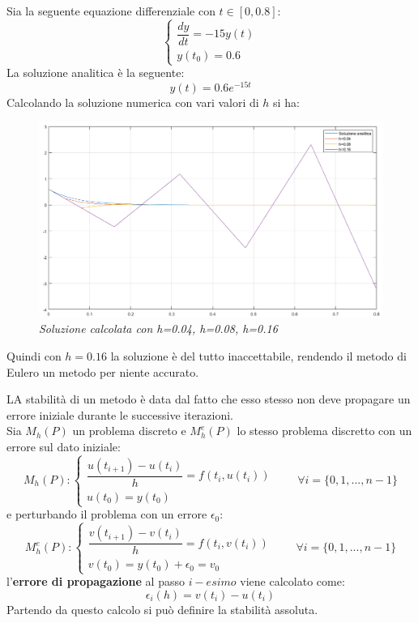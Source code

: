 \begin{example}
	Sia la seguente equazione differenziale	con $t \in [0,0.8]$:
	\begin{equation*}
		\begin{cases}
			\dfrac{dy}{dt} = -15y(t) \\[0.2cm]
			y(t_{0}) = 0.6
		\end{cases}
	\end{equation*}
	La soluzione analitica è la seguente:
	\begin{equation*}
		y(t) = 0.6 e^{-15t}
	\end{equation*}
	Calcolando la soluzione numerica con vari valori di $h$ si ha:
	\begin{figure}[H]
		\centering
		\includegraphics[width=\textwidth]{matlab/stabilita.png}
		\caption{\textit{Soluzione calcolata con h=0.04, h=0.08, h=0.16}}
	\end{figure}
	Quindi con $h=0.16$ la soluzione è del tutto inaccettabile, rendendo il metodo di Eulero un metodo per niente accurato.
\end{example}
LA stabilità di un metodo è data dal fatto che esso stesso non deve propagare un errore iniziale durante le successive iterazioni.
\\Sia $M_h(P)$ un problema discreto e $M^e_h(P)$ lo stesso problema discretto con un errore sul dato iniziale:
\begin{equation*}
	M_h(P) :
	\begin{cases}
		\dfrac{u(t_{i+1})-u(t_i)}{h} = f(t_i,u(t_i))  \\[0.2cm]
		u(t_{0}) = y(t_0)
	\end{cases}
	\qquad \forall i = \{0,1,...,n-1\}
\end{equation*}
e perturbando il problema con un errore $\epsilon_0$:
\begin{equation*}
	M^e_h(P) :
	\begin{cases}
		\dfrac{v(t_{i+1})-v(t_i)}{h} = f(t_i,v(t_i))  \\[0.2cm]
		v(t_{0}) = y(t_0)+\epsilon_0 = v_0
	\end{cases}
	\qquad \forall i = \{0,1,...,n-1\}
\end{equation*}
l'\textbf{errore di propagazione} al passo $i-esimo$ viene calcolato come:
\begin{equation}
	\epsilon_i(h) = v(t_i) - u(t_i)
\end{equation}
Partendo da questo calcolo si può definire la stabilità assoluta.


